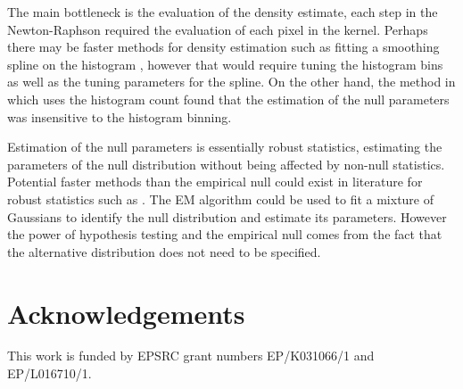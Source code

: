 \documentclass{proc}
\begin{document}
The main bottleneck is the evaluation of the density estimate, each step in the Newton-Raphson required the evaluation of each pixel in the kernel. Perhaps there may be faster methods for density estimation such as fitting a smoothing spline on the histogram \citep{efron2004large}, however that would require tuning the histogram bins as well as the tuning parameters for the spline. On the other hand, the method in \cite{schwartzman2008empirical} which uses the histogram count found that the estimation of the null parameters was insensitive to the histogram binning.

Estimation of the null parameters is essentially robust statistics, estimating the parameters of the null distribution without being affected by non-null statistics. Potential faster methods than the empirical null could exist in literature for robust statistics such as \cite{hampel1986robust, rousseeuw1987robust, maronna2006robust, huber2009robust, jewson2018principles}. The EM algorithm \citep{dempster1977maximum} could be used to fit a mixture of Gaussians to identify the null distribution and estimate its parameters. However the power of hypothesis testing and the empirical null comes from the fact that the alternative distribution does not need to be specified.

\section{Acknowledgements}
This work is funded by EPSRC grant numbers EP/K031066/1 and EP/L016710/1.



\end{document}
